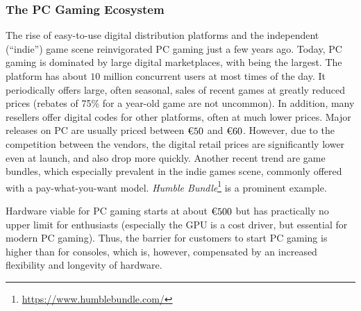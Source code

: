 


\subsubsection{The PC Gaming Ecosystem}
\label{sec:pcgaming}

The rise of easy-to-use digital distribution platforms and the independent (``indie'') game scene reinvigorated PC gaming just a few years ago. Today, PC gaming is dominated by large digital marketplaces, with \steam being the largest. The platform has about $10$ million concurrent users at most times of the day. It periodically offers large, often seasonal, sales of recent games at greatly reduced prices (rebates of 75\% for a year-old game are not uncommon). In addition, many resellers offer digital codes for other platforms, often at much lower prices.%
Major releases on PC are usually priced between $\text{\texteuro} 50$ and $\text{\texteuro} 60$. However, due to the competition between the vendors, the digital retail prices are significantly lower even at launch, and also drop more quickly. Another recent trend are game bundles, which especially prevalent in the indie games scene, commonly offered with a pay-what-you-want model. \textit{Humble Bundle}\footnote{\url{https://www.humblebundle.com/}} is a prominent example. %


Hardware viable for PC gaming starts at about $\text{\texteuro} 500$ but has practically no upper limit for enthusiasts (especially the \gls{GPU} is a cost driver, but essential for modern PC gaming). Thus, the barrier for customers to start PC gaming is higher than for consoles, which is, however, compensated by an increased flexibility and longevity of hardware.


